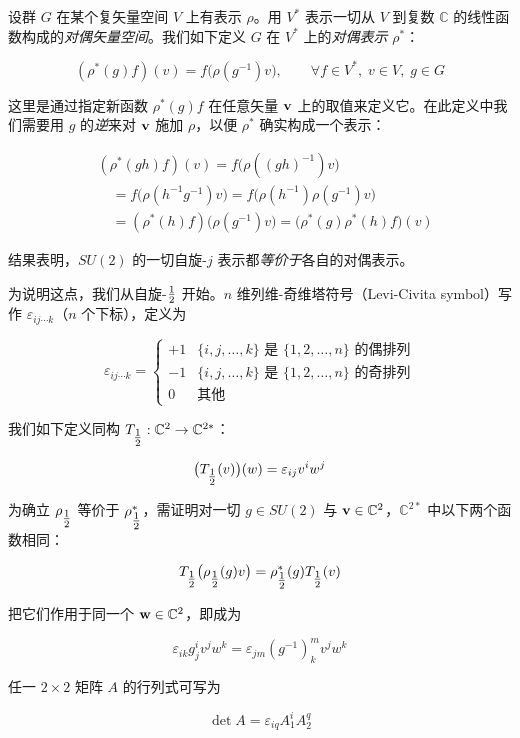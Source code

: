 设群 $G$ 在某个复矢量空间 $V$ 上有表示 $\rho$。用 $V^{*}$ 表示一切从 $V$ 到复数 $\mathbb{C}$ 的线性函数构成的\emph{对偶矢量空间}。我们如下定义 $G$ 在 $V^{*}$ 上的\emph{对偶表示} $\rho^{*}$：

\[
(\rho^{*}(g)f)(v)=f\bigl(\rho(g^{-1})v\bigr),\qquad \forall f\in V^{*},\;v\in V,\;g\in G
\]

这里是通过指定新函数 $\rho^{*}(g)f$ 在任意矢量 $\mathbf{v}$ 上的取值来定义它。在此定义中我们需要用 $g$ 的\emph{逆}来对 $\mathbf{v}$ 施加 $\rho$，以便 $\rho^{*}$ 确实构成一个表示：

\begin{align*}
&(\rho^{*}(gh)f)(v)=f\bigl(\rho((gh)^{-1})v\bigr)\\
&\quad=f\bigl(\rho(h^{-1}g^{-1})v\bigr)
=f\bigl(\rho(h^{-1})\rho(g^{-1})v\bigr)\\
&\quad=(\rho^{*}(h)f)\bigl(\rho(g^{-1})v\bigr)
=\bigl(\rho^{*}(g)\rho^{*}(h)f\bigr)(v)
\end{align*}

结果表明，$SU(2)$ 的一切自旋-$j$ 表示都\emph{等价于}各自的对偶表示。

为说明这点，我们从自旋-$\tfrac{1}{2}$ 开始。$n$ 维列维-奇维塔符号（Levi-Civita symbol）写作 $\varepsilon_{ij\cdots k}$（$n$ 个下标），定义为

\[
\varepsilon_{ij\cdots k}=\begin{cases}+1 & \{i,j,\dots,k\}\text{ 是 }\{1,2,\dots,n\}\text{ 的偶排列}\\ -1 & \{i,j,\dots,k\}\text{ 是 }\{1,2,\dots,n\}\text{ 的奇排列}\\ 0 & \text{其他}\end{cases}
\]

我们如下定义同构 $T_{\tfrac{1}{2}}:\mathbb{C}^{2}\to\mathbb{C}^{2*}$：

\[
\bigl(T_{\tfrac{1}{2}}(v)\bigr)(w)=\varepsilon_{ij}v^{i}w^{j}
\]

为确立 $\rho_{\tfrac{1}{2}}$ 等价于 $\rho_{\tfrac{1}{2}}^{*}$，需证明对一切 $g\in SU(2)$ 与 $\mathbf{v}\in\mathbb{C}^{2}$，$\mathbb{C}^{2*}$ 中以下两个函数相同：

\[
T_{\tfrac{1}{2}}\bigl(\rho_{\tfrac{1}{2}}(g)v\bigr)=\rho_{\tfrac{1}{2}}^{*}(g)T_{\tfrac{1}{2}}(v)
\]

把它们作用于同一个 $\mathbf{w}\in\mathbb{C}^{2}$，即成为

\[
\varepsilon_{ik}g^{i}_{j}v^{j}w^{k}=\varepsilon_{jm}(g^{-1})^{m}_{k}v^{j}w^{k}
\]

任一 $2\times2$ 矩阵 $A$ 的行列式可写为

\[
\det A=\varepsilon_{iq}A^{i}_{1}A^{q}_{2}
\]

